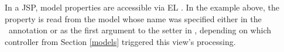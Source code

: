 
In a JSP, model properties are accessible via EL \cite{el}. In the example above,
the property  is read from the  model whose name
was specified either in the \Named\ annotation or as the first argument to 
the setter in \Models, depending on which controller from Section \ref{models}
triggered this view's processing.

